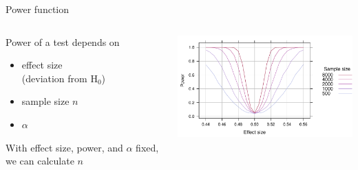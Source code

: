 \documentclass[aspectratio=169]{beamer}
\begin{document}
\begin{frame}{Power function}

\begin{columns}
\begin{column}{4.5cm}
Power of a test depends on\\[1ex]

\begin{itemize}
\item effect size\\
(deviation from H$_0$)

\item sample size $n$

\item $\alpha$\\[2ex]
\end{itemize}

With effect size, power, and $\alpha$ fixed, we can calculate $n$
\end{column}
%
\begin{column}{10cm}
\includegraphics[width=10cm]{../figures/OCbinomtest}
\end{column}
\end{columns}

\end{frame}
\end{document}
